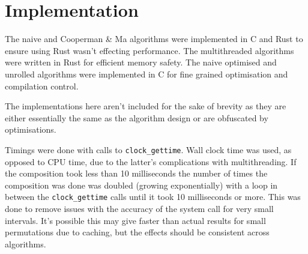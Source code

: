 \documentclass{article}
\begin{document}






\section{Implementation}

The naive and Cooperman \& Ma algorithms were implemented in C and Rust to ensure using Rust wasn't effecting performance. The multithreaded algorithms were written in Rust for efficient memory safety. The naive optimised and unrolled algorithms were implemented in C for fine grained optimisation and compilation control.

The implementations here aren't included for the sake of brevity as they are either essentially the same as the algorithm design or are obfuscated by optimisations.

Timings were done with calls to \texttt{clock\_gettime}. Wall clock time was used, as opposed to CPU time, due to the latter's complications with multithreading. If the composition took less than 10 milliseconds the number of times the composition was done was doubled (growing exponentially) with a loop in between the \texttt{clock\_gettime} calls until it took 10 milliseconds or more. This was done to remove issues with the accuracy of the system call for very small intervals. It's possible this may give faster than actual results for small permutations due to caching, but the effects should be consistent across algorithms.
\end{document}

